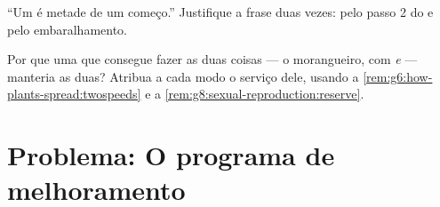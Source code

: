 \begin{exercise}[$\star\star$]\label{exo:g8:sexual-reproduction:11}
``Um  é metade de um começo.'' Justifique a frase duas vezes:
pelo passo 2 do  e pelo embaralhamento.
\end{exercise}

\begin{exercise}[$\star\star\star$]\label{exo:g8:sexual-reproduction:12}
Por que uma  que consegue fazer as duas coisas --- o
morangueiro, com  \emph{e}  --- manteria as duas?
Atribua a cada modo o serviço dele, usando a
\cref{rem:g6:how-plants-spread:twospeeds} e a
\cref{rem:g8:sexual-reproduction:reserve}.
\end{exercise}

\section{Problema: O programa de melhoramento}

